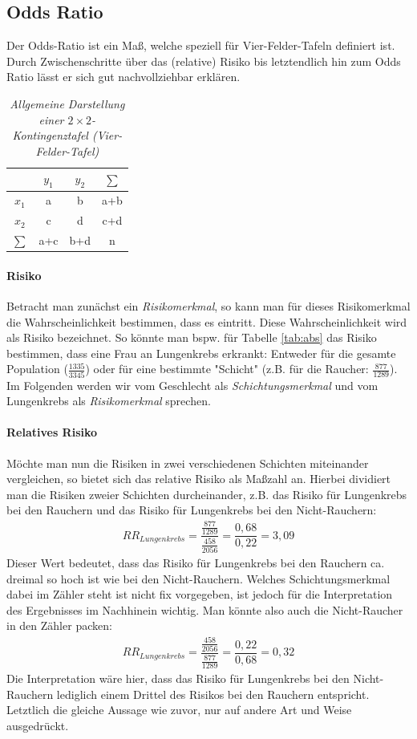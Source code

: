 \documentclass[a4paper]{article}
\begin{document}
\clearpage

\subsection{Odds Ratio}
Der Odds-Ratio ist ein Maß, welche speziell für Vier-Felder-Tafeln definiert ist. Durch Zwischenschritte über das (relative) Risiko bis letztendlich hin zum Odds Ratio lässt er sich gut nachvoll\-ziehbar erklären.

\begin{table}[htbp]
\centering
\begin{tabular}{c|cc|c}
&$y_1$&$y_2$&$\sum$\\
\hline
$x_1$ & a&b&a+b\\
$x_2$&c&d&c+d\\
\hline
$\sum$&a+c&b+d&n
\end{tabular}
    \caption{\textit{Allgemeine Darstellung einer $2\times2$-Kontingenztafel (Vier-Felder-Tafel)}}
    \label{tab:2k2}
\end{table}

\paragraph{Risiko} Betracht man zunächst ein \textit{Risikomerkmal}, so kann man für dieses Risikomerkmal die Wahrscheinlichkeit bestimmen, dass es eintritt. Diese Wahrscheinlichkeit wird als Risiko bezeichnet. So könnte man bspw. für Tabelle \ref{tab:abs} das Risiko bestimmen, dass eine Frau an Lungenkrebs erkrankt: Entweder für die gesamte Population ($\frac{1335}{3345}$) oder für eine bestimmte "Schicht" (z.B. für die Raucher: $\frac{877}{1289}$). Im Folgenden werden wir vom Geschlecht als \textit{Schichtungsmerkmal} und vom Lungenkrebs als \textit{Risikomerkmal} sprechen.

\paragraph{Relatives Risiko} Möchte man nun die Risiken in zwei verschiedenen Schichten miteinander vergleichen, so bietet sich das relative Risiko als Maßzahl an. Hierbei dividiert man die Risiken zweier Schichten durcheinander, z.B. das Risiko für Lungenkrebs bei den Rauchern und das Risiko für Lungenkrebs bei den Nicht-Rauchern:
\begin{align*}
    RR_{Lungenkrebs} = \dfrac{\frac{877}{1289}}{\frac{458}{2056}} = \dfrac{0,68}{0,22} = 3,09
\end{align*}
Dieser Wert bedeutet, dass das Risiko für Lungenkrebs bei den Rauchern ca. dreimal so hoch ist wie bei den Nicht-Rauchern. Welches Schichtungsmerkmal dabei im Zähler steht ist nicht fix vorgegeben, ist jedoch für die Interpretation des Ergebnisses im Nachhinein wichtig. Man könnte also auch die Nicht-Raucher in den Zähler packen: 
\begin{align*}
    RR_{Lungenkrebs} = \dfrac{\frac{458}{2056}}{\frac{877}{1289}} = \dfrac{0,22}{0,68} = 0,32
\end{align*}
Die Interpretation wäre hier, dass das Risiko für Lungenkrebs bei den Nicht-Rauchern lediglich einem Drittel des Risikos bei den Rauchern entspricht. Letztlich die gleiche Aussage wie zuvor, nur auf andere Art und Weise ausgedrückt.
\end{document}
